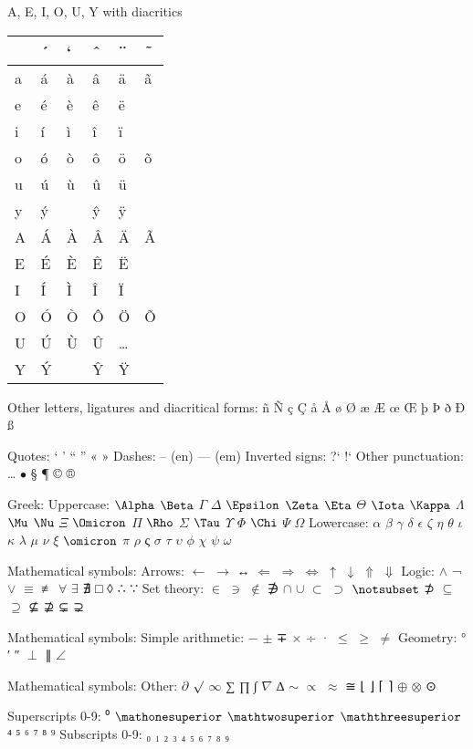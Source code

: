 \documentclass[letterpaper,portrait,12pt]{article}
\begin{document}
\setlength{\oddsidemargin}{0.7874in-1in}
\setlength{\textwidth}{\paperwidth - 0.7874in-0.7874in}

A, E, I, O, U, Y with diacritics

%
% 
\begin{table}[h]\begin{tabular}{|l|l|l|l|l|l|}
\hline
 &´&`&ˆ&¨&˜\\
\hline
a&\'{a}&\`{a}&â&\"{a}&ã\\
\hline
e&\'{e}&\`{e}&ê&\"{e}&\\
\hline
i&\'{i}&ì&î&ï&\\
\hline
o&\'{o}&\`{o}&ô&\"{o}&õ\\
\hline
u&\'{u}&ù&û&\"{u}&\\
\hline
y&\'{y}&&\^y&ÿ&\\
\hline
A&\'{A}&\`{A}&Â&\"{A}&Ã\\
\hline
E&\'{E}&\`{E}&Ê&\"{E}&\\
\hline
I&\'{I}&Ì&Î&Ï&\\
\hline
O&\'{O}&Ò&Ô&\"{O}&Õ\\
\hline
U&\'{U}&Ù&Û&\ldots{}&\\
\hline
Y&\'{Y}&&\^Y&\"Y&\\
\hline
\end{tabular}
\end{table}



Other letters, ligatures and diacritical forms: \~{n} \~{N} \c{c} \c{C} å Å {\o} {\O} æ Æ \oe{} \OE{} þ Þ ð Ð \ss{}


Quotes: {`} ' {``} '' « » \guilsinglleft{} \guilsinglright{} \quotesinglbase{} \quotedblbase{} Dashes: -- (en) --- (em) Inverted signs: ?` !` Other punctuation: \ldots{} $\bullet$ § ¶ \dag{} \ddag{} © ®


Greek: Uppercase: $\Alpha$ $\Beta$ $\Gamma$ $\Delta$ $\Epsilon$ $\Zeta$ $\Eta$ $\Theta$ $\Iota$ $\Kappa$ $\Lambda$ $\Mu$ $\Nu$ $\Xi$ $\Omicron$ $\Pi$ $\Rho$ $\Sigma$ $\Tau$ $\Upsilon$ $\Phi$ $\Chi$ $\Psi$ $\Omega$ Lowercase: $\alpha$ $\beta$ $\gamma$ $\delta$ $\epsilon$ $\zeta$ $\eta$ $\theta$ $\iota$ $\kappa$ $\lambda$ $\mu$ $\nu$ $\xi$ $\omicron$ $\pi$ $\rho$ ς $\sigma$ $\tau$ $\upsilon$ $\phi$ $\chi$ $\psi$ $\omega$


Mathematical symbols: Arrows: $\leftarrow$ $\rightarrow$ ↔ $\Leftarrow$ $\Rightarrow$ $\Leftrightarrow$ $\uparrow$ $\downarrow$ $\Uparrow$ $\Downarrow$ Logic: $\land$ ¬ $\lor$ $\equiv$ ≢ $\forall$ $\exists$ ∄ □ ◊ ∴ ∵ Set theory: $\in$ $\ni$ $\notin$ ∌ $\cap$ $\cup$ $\subset$ $\supset$ $\notsubset$ ⊅ $\subseteq$ $\supseteq$ ⊈ ⊉ ⊊ ⊋


Mathematical symbols: Simple arithmetic: $-$ $\pm$ ∓ × ÷ · $\leq$ $\geq$ $\neq$ Geometry: ° ′ ″ $\perp$ ∥ $\angle$


Mathematical symbols: Other: $\partial$ $\surd$ $\infty$ ∑ ∏ ∫ $\nabla$ ∆ $\sim$ $\propto$ $\approx$ ≅ ⌊ ⌋ ⌈ ⌉ $\oplus$ $\otimes$ ⊙


Superscripts 0-9: ⁰ $\mathonesuperior$ $\mathtwosuperior$ $\maththreesuperior$ ⁴ ⁵ ⁶ ⁷ ⁸ ⁹ Subscripts 0-9: ₀ ₁ ₂ ₃ ₄ ₅ ₆ ₇ ₈ ₉
\end{document}
